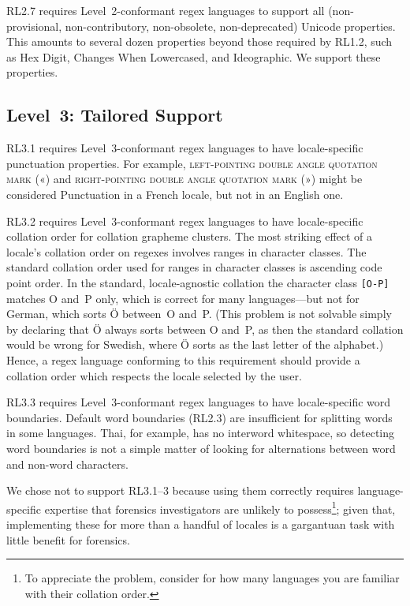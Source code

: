 \documentclass[5p,final,number,sort&compress]{elsarticle}
\newcommand{\re}[1]{\texttt{#1}}
\begin{document}
RL2.7 requires Level~2-conformant regex languages to support all (non-provisional, non-contributory, non-obso\-lete, non-deprecated) Unicode properties. This amounts to several dozen properties beyond those required by RL1.2, such as Hex Digit, Changes When Lowercased, and Ideographic. We support these properties.

\subsection{Level~3: Tailored Support}

RL3.1 requires Level~3-conformant regex languages to have locale-specific punctuation properties. For example, \textsc{left-pointing double angle quotation mark} («) and \textsc{right-pointing double angle quotation mark} (») might be considered Punctuation in a French locale, but not in an English one.

RL3.2 requires Level~3-conformant regex languages to have locale-specific collation order for collation grapheme clusters. The most striking effect of a locale's collation order on regexes involves ranges in character classes. The standard collation order used for ranges in character classes is ascending code point order. In the standard, locale-agnostic collation the character class \re{[O-P]} matches O and~P only, which is correct for many languages---but not for German, which sorts \"O between~O and~P. (This problem is not solvable simply by declaring that \"O always sorts between O and~P, as then the standard collation would be wrong for Swedish, where \"O sorts as the last letter of the alphabet.)  Hence, a regex language conforming to this requirement should provide a collation order which respects the locale selected by the user.

RL3.3 requires Level~3-conformant regex languages to have locale-specific word boundaries. Default word boundaries (RL2.3) are insufficient for splitting words in some languages. Thai, for example, has no interword whitespace, so detecting word boundaries is not a simple matter of looking for alternations between word and non-word characters.

We chose not to support RL3.1--3 because using them correctly requires language-specific expertise that forensics investigators are unlikely to possess\footnote{To appreciate the problem, consider for how many languages you are familiar with their collation order.}; given that, implementing these for more than a handful of locales is a gargantuan task with little benefit for forensics.
\end{document}
